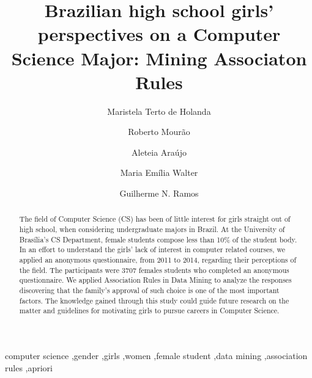 \documentclass[preprint,12pt]{elsarticle}%
\begin{document}
\begin{frontmatter}



\title{Brazilian high school girls' perspectives on a Computer Science Major: Mining Associaton Rules}

\author{Maristela Terto de Holanda}%
%
%
\author{Roberto Mourão}%
\author{Aleteia Araújo}%
\author{Maria Emília Walter}%
\author{Guilherme N. Ramos}%



\address{Department of Computer Science, University of Brasília, Brasília, Brazil}%

\begin{abstract}
The field of Computer Science (CS) has been of little interest for girls straight out of high school, when considering undergraduate majors in Brazil. At the University of Brasília’s CS Department, female students compose less than 10\% of the student body. In an effort to understand the girls’ lack of interest in computer related courses, we applied an anonymous questionnaire, from 2011 to 2014, regarding their perceptions of the field.  The participants were 3707 females students who completed an anonymous questionnaire. We applied Association Rules in Data Mining to analyze the responses discovering that the family's approval of such choice is one of the most important factors. The knowledge gained through this study could guide future research on the matter and guidelines for motivating girls to pursue careers in Computer Science.
\end{abstract}

\begin{keyword}
computer science \sep gender \sep girls \sep women \sep female student \sep data mining \sep association rules \sep apriori%


\end{keyword}

\end{frontmatter}
\end{document}
